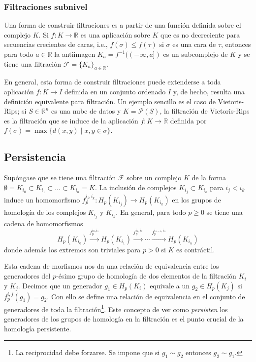 \documentclass[12pt,a4paper,twoside]{article} %
\theoremstyle{plain}
\theoremstyle{definition}
\newcommand{\R}{\mathbb{R}}
\newcommand{\tq}{\; | \;}
\newcommand{\map}[3]{#1 \colon #2 \to #3}
\begin{document}
\subsubsection{Filtraciones subnivel}
Una forma de construir filtraciones es a partir de una función definida sobre el complejo $K$. Si $\map{f}{K}{\R}$ es una aplicación sobre $K$ que es no decreciente para secuencias crecientes de caras, i.e., $f(\sigma)\leq f(\tau)$ si $\sigma$ es una cara de $\tau$, entonces para todo $a \in \R$ la antiimagen $K_a=f^{-1}((-\infty,a])$ es un subcomplejo de $K$ y se tiene una filtración $\mathcal{F}=\{K_a\}_{a \in \R}$. 

En general, esta forma de construir filtraciones puede extenderse a toda aplicación $\map{f}{K}{I}$ definida en un conjunto ordenado $I$ y, de hecho, resulta una definición equivalente para filtración. Un ejemplo sencillo es el caso de Vietoris-Rips; si $S\in\R^n$ es una nube de datos y $K=\mathcal{P}(S)$, la filtración de Vietoris-Rips es la filtración que se induce de la aplicación $\map{f}{K}{\R}$ definida por $f(\sigma) = \max \{d(x,y) \tq x,y\in \sigma \}$.

\subsection{Persistencia}
Supóngase que se tiene una filtración $\mathcal{F}$ sobre un complejo $K$ de la forma $ \emptyset = K_{i_0} \subset K_{i_1} \subset \dots \subset K_{i_n} = K $. La inclusión de complejos $K_{i_j} \subset K_{i_k}$ para $i_j<i_k$ induce un homomorfismo $\map{f_p^{i_j,i_k}}{H_p(K_{i_j})}{H_p(K_{i_k})}$ en los grupos de homología de los complejos $K_{i_j}$ y $K_{i_k}$. En general, para todo $p\geq 0$ se tiene una cadena de homomorfismos
$$  H_p(K_{i_0}) \stackrel{f_p^{i_0,i_1}}{\rightarrow} H_p(K_{i_1}) \stackrel{f_p^{i_1,i_2}}{\rightarrow} \cdots \stackrel{f_p^{i_{n-1},i_n}}{\rightarrow} H_p(K_{i_n}) $$
donde además los extremos son triviales para $p>0$ si $K$ es contráctil.

Esta cadena de morfismos nos da una relación de equivalencia entre los generadores del $p$-ésimo grupo de homología de dos elementos de la filtración $K_i$ y $K_j$. Decimos que un generador $g_1 \in H_p(K_i)$ equivale a un $g_2 \in H_p(K_j)$ si $f_p^{i,j}(g_1) = g_2$. Con ello se define una relación de equivalencia en el conjunto de generadores de toda la filtración\footnote{La reciprocidad debe forzarse. Se impone que si $g_1 \sim g_2$ entonces $g_2 \sim g_1$.}. Este concepto de ver como \emph{persisten} los generadores de los grupos de homología en la filtración es el punto crucial de la homología persistente.
\end{document}

